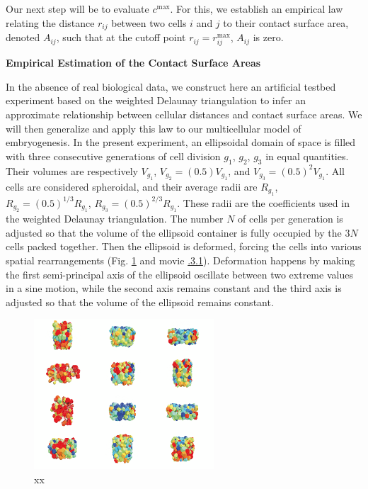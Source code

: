 Our next step will be to evaluate $c^{\mathrm{max}}$. For this, we establish an empirical law relating the distance $r_{ij}$ between two cells $i$ and $j$ to their contact surface area, denoted $A_{ij}$, such that at the cutoff point $r_{ij} = r^{\mathrm{max}}_{ij}$, $A_{ij}$ is zero.

\textbf{Empirical Estimation of the Contact Surface Areas}

In the absence of real biological data, we construct here an artificial testbed experiment based on the weighted Delaunay triangulation to infer an approximate relationship between cellular distances and contact surface areas. We will then generalize and apply this law to our multicellular model of embryogenesis. In the present experiment, an ellipsoidal domain of space is filled with three consecutive generations of cell division $g_1$, $g_2$, $g_3$ in equal quantities. Their volumes are respectively $V_{g_1}$, $V_{g_2} = (0.5) V_{g_1}$, and $V_{g_3} = \left( 0.5 \right)^{2} V_{g_1}$. All cells are considered spheroidal, and their average radii are $R_{g_1}$, $R_{g_2} = \left( 0.5 \right)^{1/3} R_{g_1}$, $R_{g_3} = \left( 0.5 \right)^{2/3} R_{g_1}$. These radii are the coefficients used in the weighted Delaunay triangulation. The number $N$ of cells per generation is adjusted so that the volume of the ellipsoid container is fully occupied by the $3N$ cells packed together. Then the ellipsoid is deformed, forcing the cells into various spatial rearrangements (Fig. \ref{spatial_neighb_Fusion_light} and movie \href{http://public.iscpif.fr/~delile/morphogenesis/manuscript/pragma/figure.html?name=potential_surf_dist_movie_1677cells_gS11_filtered}{.3.1}). Deformation happens by making the first semi-principal axis of the ellipsoid oscillate between two extreme values in a sine motion, while the second axis remains constant and the third axis is adjusted so that the volume of the ellipsoid remains constant.
\begin{figure}
\begin{center}
\includegraphics[width=0.6\textwidth]{../../images/MECAGEN/spatial_neighb/surf_dist_movie_1677cells_gS11_filtered_SNAPSHOT/Fusion_light.png}
\end{center}
\caption{xx}
\label{spatial_neighb_Fusion_light}
\end{figure}


